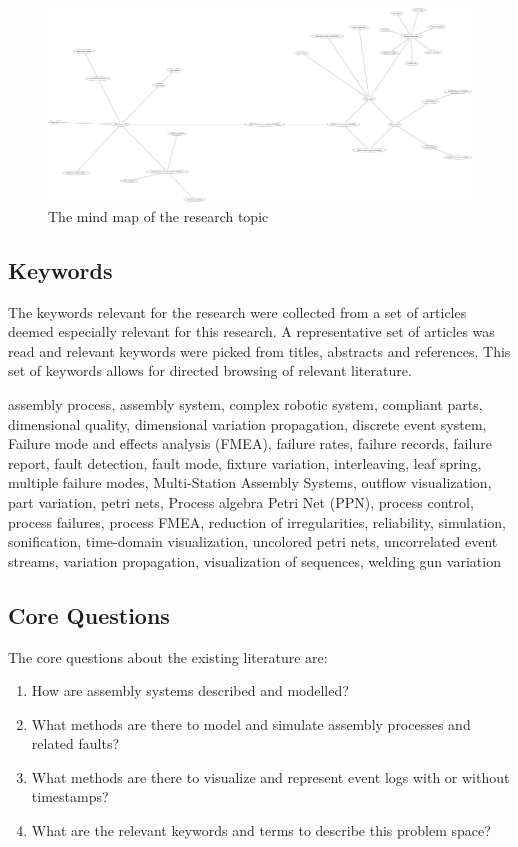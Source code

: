 \documentclass[a4paper,10pt]{article}
\begin{document}
\begin{figure}[ht]
\begin{center}
 \includegraphics[width=\textwidth]{./field.png}
\end{center}
\caption{The mind map of the research topic}
\end{figure} 

\subsection{Keywords}

The keywords relevant for the research were collected from a set of articles deemed especially relevant for this research. A representative set of articles was
read and relevant keywords were picked from titles, abstracts and references. This set of keywords allows for directed browsing of relevant literature.

assembly process, assembly system, complex robotic system, compliant parts, dimensional quality, dimensional variation propagation, discrete event system,
Failure mode and effects analysis (FMEA), failure rates, failure records, failure report, fault detection, fault mode, fixture variation, interleaving,
leaf spring, multiple failure modes, Multi-Station Assembly Systems, outflow visualization,
part variation, petri nets, Process algebra Petri Net (PPN), process control, process failures, process FMEA, reduction of irregularities, reliability,
simulation, sonification, time-domain visualization, uncolored petri nets, uncorrelated event streams, variation propagation, visualization of sequences,
welding gun variation

\subsection{Core Questions}

The core questions about the existing literature are:
\begin{enumerate}
 \item How are assembly systems described and modelled?
 \item What methods are there to model and simulate assembly processes and related faults?
 \item What methods are there to visualize and represent event logs with or without timestamps?
 \item What are the relevant keywords and terms to describe this problem space?
\end{enumerate}
\end{document}
